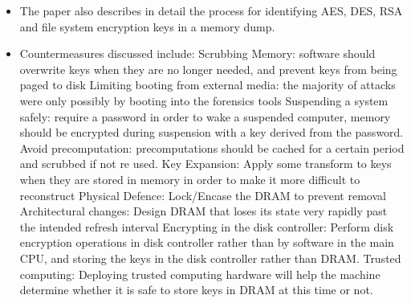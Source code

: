 \documentclass[12pt, a4paper]{article}
\begin{document}
\begin{multicols*}{2}
\begin{itemize}
	\item The paper also describes in detail the process for identifying AES, DES, RSA and file system encryption keys in a memory dump.
	\item Countermeasures discussed include:
	\subitem Scrubbing Memory: software should overwrite keys when they are no longer needed, and prevent keys from being paged to disk
	\subitem Limiting booting from external media: the majority of attacks were only possibly by booting into the forensics tools
	\subitem Suspending a system safely: require a password in order to wake a suspended computer, memory should be encrypted during suspension with a key derived from the password.
	\subitem Avoid precomputation: precomputations should be cached for a certain period and scrubbed if not re used.
	\subitem Key Expansion: Apply some transform to keys when they are stored in memory in order to make it more difficult to reconstruct
	\subitem Physical Defence: Lock/Encase the DRAM to prevent removal
	\subitem Architectural changes: Design DRAM that loses its state very rapidly past the intended refresh interval
	\subitem Encrypting in the disk controller: Perform disk encryption operations in disk controller rather than by software in the main CPU, and storing the keys in the disk controller rather than DRAM.
	\subitem Trusted computing: Deploying trusted computing hardware will help the machine determine whether it is safe to store keys in DRAM at this time or not.
\end{itemize}
\end{multicols*}
\end{document}
